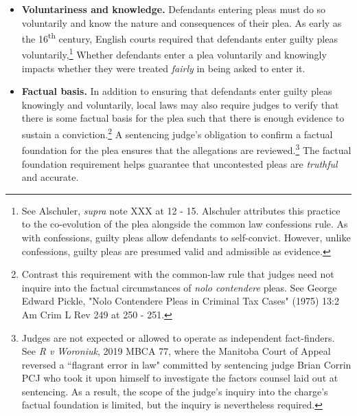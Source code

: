 \begin{itemize}
\item \textbf{Voluntariness and knowledge.} Defendants entering pleas must do so voluntarily and know the nature and consequences of their plea. As early as the 16\textsuperscript{th} century, English courts required that defendants enter guilty pleas voluntarily,\footnote{See Alschuler, \textit{supra} note XXX at 12 - 15. Alschuler attributes this practice to the co-evolution of the plea alongside the common law confessions rule. As with confessions, guilty pleas allow defendants to self-convict. However, unlike confessions, guilty pleas are presumed valid and admissible as evidence.} Whether defendants enter a plea voluntarily and knowingly impacts whether they were treated \textit{fairly} in being asked to enter it.
\item \textbf{Factual basis.} In addition to ensuring that defendants enter guilty pleas knowingly and voluntarily, local laws may also require judges to verify that there is some factual basis for the plea such that there is enough evidence to sustain a conviction.\footnote{Contrast this requirement with the common-law rule that judges need not inquire into the factual circumstances of \textit{nolo contendere} pleas. See George Edward Pickle, "Nolo Contendere Pleas in Criminal Tax Cases" (1975) 13:2 Am Crim L Rev 249 at 250 - 251.} A sentencing judge's obligation to confirm a factual foundation for the plea ensures that the allegations are reviewed.\footnote{Judges are not expected or allowed to operate as independent fact-finders. See \textit{R v Woroniuk}, 2019 MBCA 77, where the Manitoba Court of Appeal reversed a ``flagrant error in law" committed by sentencing judge Brian Corrin PCJ who took it upon himself to investigate the factors counsel laid out at sentencing. As a result, the scope of the judge's inquiry into the charge's factual foundation is limited, but the inquiry is nevertheless required.} The factual foundation requirement helps guarantee that uncontested pleas are \textit{truthful} and accurate.

\end{itemize}
